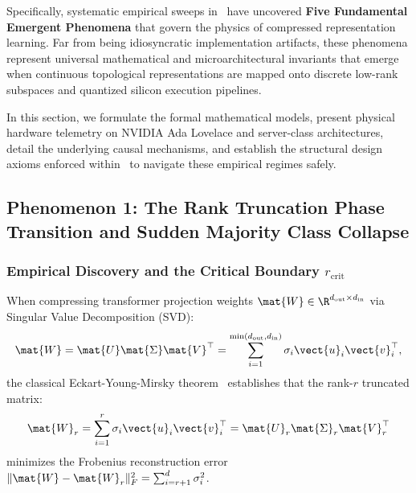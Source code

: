 Specifically, systematic empirical sweeps in \neuralops\ have uncovered \textbf{Five Fundamental Emergent Phenomena} that govern the physics of compressed representation learning. Far from being idiosyncratic implementation artifacts, these phenomena represent universal mathematical and microarchitectural invariants that emerge when continuous topological representations are mapped onto discrete low-rank subspaces and quantized silicon execution pipelines. 

In this section, we formulate the formal mathematical models, present physical hardware telemetry on NVIDIA Ada Lovelace and server-class architectures, detail the underlying causal mechanisms, and establish the structural design axioms enforced within \neuralops\ to navigate these empirical regimes safely.

\subsection{Phenomenon 1: The Rank Truncation Phase Transition and Sudden Majority Class Collapse}
\label{sec:phenom_rank_phase_transition}

\subsubsection{Empirical Discovery and the Critical Boundary $r_{\text{crit}}$}
\label{sec:phenom_rank_discovery}

When compressing transformer projection weights $\mat{W} \in \R^{d_{\text{out}} \times d_{\text{in}}}$ via Singular Value Decomposition (SVD):
\begin{equation}
\mat{W} = \mat{U} \mat{\Sigma} \mat{V}^\top = \sum_{i=1}^{\min(d_{\text{out}}, d_{\text{in}})} \sigma_i \vect{u}_i \vect{v}_i^\top,
\end{equation}
the classical Eckart-Young-Mirsky theorem~\cite{eckart1936approximation} establishes that the rank-$r$ truncated matrix:
\begin{equation}
\mat{W}_r = \sum_{i=1}^{r} \sigma_i \vect{u}_i \vect{v}_i^\top = \mat{U}_r \mat{\Sigma}_r \mat{V}_r^\top
\end{equation}
minimizes the Frobenius reconstruction error $\|\mat{W} - \mat{W}_r\|_F^2 = \sum_{i=r+1}^{d} \sigma_i^2$. 

